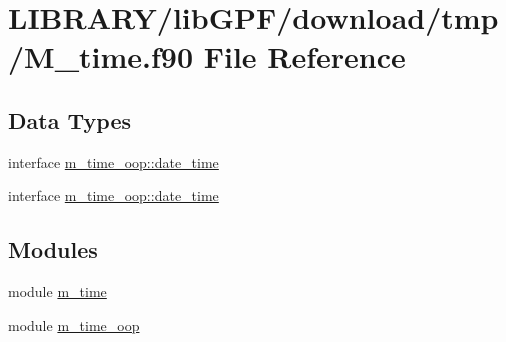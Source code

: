 \hypertarget{M__time_8f90}{}\section{L\+I\+B\+R\+A\+R\+Y/lib\+G\+P\+F/download/tmp/\+M\+\_\+time.f90 File Reference}
\label{M__time_8f90}
\subsection*{Data Types}
\begin{DoxyCompactItemize}
\item 
interface \hyperlink{structm__time__oop_1_1date__time}{m\+\_\+time\+\_\+oop\+::date\+\_\+time}
\item 
interface \hyperlink{structm__time__oop_1_1date__time}{m\+\_\+time\+\_\+oop\+::date\+\_\+time}
\end{DoxyCompactItemize}
\subsection*{Modules}
\begin{DoxyCompactItemize}
\item 
module \hyperlink{namespacem__time}{m\+\_\+time}
\item 
module \hyperlink{namespacem__time__oop}{m\+\_\+time\+\_\+oop}
\end{DoxyCompactItemize}
